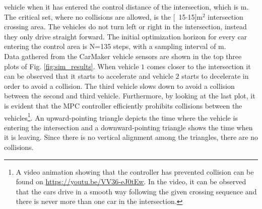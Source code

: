 \documentclass[letterpaper,10pt,conference]{ieeeconf}
\begin{document}
vehicle when it has entered the control distance of the intersection,
which is \unit[60]{m}. The critical set, where no collisions are allowed, is
the \unit[15$\cdot$15]{m$^2$} intersection crossing area. The vehicles do not
turn left or right in the intersection, instead they only drive
straight forward. The initial optimization horizon for every car
entering the control area is N=135 steps, with a sampling interval of \unit[1]{m}. \\ \indent
Data gathered from the CarMaker vehicle sensors are shown in the top three plots of Fig. \ref{fig:sim_results}. When vehicle $1$ comes closer to the intersection it can be observed that it starts to accelerate and vehicle $2$ starts to decelerate in order to avoid a collision. The third vehicle slows down to avoid a collision between the second and third vehicle.
Furthermore, by looking at the last plot, it is evident that the MPC controller efficiently prohibits collisions between the vehicles\footnote{A video animation showing that the controller has prevented collision can be found on \url{https://youtu.be/VV36-eJ0tEw}. In the video, it can be observed that the cars drive in a smooth way following the given crossing sequence and there is never more than one car in the intersection.}. An upward-pointing triangle depicts the time where the vehicle is entering the intersection and a downward-pointing triangle shows the time when it is leaving. Since there is no vertical alignment among the triangles, there are no collisions.
\end{document}
